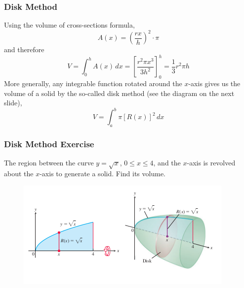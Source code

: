 \documentclass[xcolor=dvipsnames]{beamer}
\begin{document}
\begin{frame}
  \frametitle{Disk Method}
  Using the volume of cross-sections formula,
\begin{equation}
  \label{eq:deiwizou}
  A(x)=\left(\frac{rx}{h}\right)^{2}\cdot\pi
\end{equation}
and therefore
\begin{equation}
  \label{eq:eebeoghe}
  V=\int_{0}^{h}A(x)\,dx=\left[\frac{r^{2}\pi{}x^{3}}{3h^{2}}\right]_{0}^{h}=\frac{1}{3}r^{2}\pi{}h
\end{equation}
More generally, any integrable function rotated around the $x$-axis gives us the
volume of a solid by the so-called \alert{disk method} (see the
diagram on the next slide),
\begin{equation}
  \label{eq:eipahbuy}
  V=\int_{a}^{b}\pi[R(x)]^{2}\,dx
\end{equation}
\end{frame}

\begin{frame}
  \frametitle{Disk Method Exercise}
{\ubung} The region between the curve $y=\sqrt{x}$, $0\leq{}x\leq{}4$,
and the $x$-axis is revolved about the $x$-axis to generate a solid.
Find its volume.
  \begin{figure}[h]
    \includegraphics[scale=0.65]{./diagrams/disk_ed.png}
  \end{figure}
\end{frame}
\end{document}
